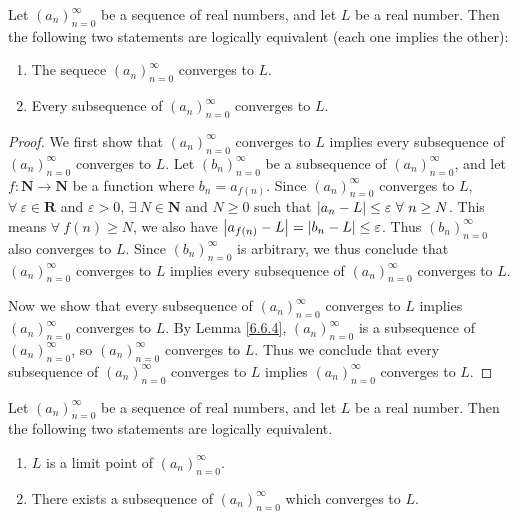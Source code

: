 \begin{proposition}\label{6.6.5}
Let \((a_n)_{n = 0}^\infty\) be a sequence of real numbers, and let \(L\) be a real number.
Then the following two statements are logically equivalent (each one implies the other):
\begin{enumerate}
    \item The sequece \((a_n)_{n = 0}^\infty\) converges to \(L\).
    \item Every subsequence of \((a_n)_{n = 0}^\infty\) converges to \(L\).
\end{enumerate}
\end{proposition}

\begin{proof}
We first show that \((a_n)_{n = 0}^\infty\) converges to \(L\) implies every subsequence of \((a_n)_{n = 0}^\infty\) converges to \(L\).
Let \((b_n)_{n = 0}^\infty\) be a subsequence of \((a_n)_{n = 0}^\infty\), and let \(f : \mathbf{N} \to \mathbf{N}\) be a function where \(b_n = a_{f(n)}\).
Since \((a_n)_{n = 0}^\infty\) converges to \(L\), \(\forall\ \varepsilon \in \mathbf{R}\) and \(\varepsilon > 0\), \(\exists\ N \in \mathbf{N}\) and \(N \geq 0\) such that \(\abs*{a_n - L} \leq \varepsilon \ \forall\ n \geq N\).
This means \(\forall\ f(n) \geq N\), we also have \(\abs*{a_{f(n)} - L} = \abs*{b_n - L} \leq \varepsilon\).
Thus \((b_n)_{n = 0}^\infty\) also converges to \(L\).
Since \((b_n)_{n = 0}^\infty\) is arbitrary, we thus conclude that \((a_n)_{n = 0}^\infty\) converges to \(L\) implies every subsequence of \((a_n)_{n = 0}^\infty\) converges to \(L\).

Now we show that every subsequence of \((a_n)_{n = 0}^\infty\) converges to \(L\) implies \((a_n)_{n = 0}^\infty\) converges to \(L\).
By Lemma \ref{6.6.4}, \((a_n)_{n = 0}^\infty\) is a subsequence of \((a_n)_{n = 0}^\infty\), so \((a_n)_{n = 0}^\infty\) converges to \(L\).
Thus we conclude that every subsequence of \((a_n)_{n = 0}^\infty\) converges to \(L\) implies \((a_n)_{n = 0}^\infty\) converges to \(L\).
\end{proof}

\begin{proposition}\label{6.6.6}
Let \((a_n)_{n = 0}^\infty\) be a sequence of real numbers, and let \(L\) be a real number.
Then the following two statements are logically equivalent.
\begin{enumerate}
    \item \(L\) is a limit point of \((a_n)_{n = 0}^\infty\).
    \item There exists a subsequence of \((a_n)_{n = 0}^\infty\) which converges to \(L\).
\end{enumerate}
\end{proposition}

